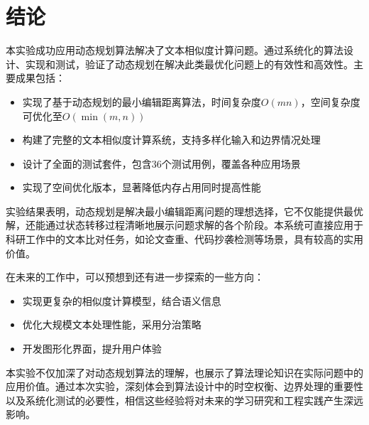 \documentclass[a4paper]{article}
\begin{document}
\section{结论}
本实验成功应用动态规划算法解决了文本相似度计算问题。通过系统化的算法设计、实现和测试，验证了动态规划在解决此类最优化问题上的有效性和高效性。主要成果包括：

\begin{itemize}
	\item 实现了基于动态规划的最小编辑距离算法，时间复杂度$O(mn)$，空间复杂度可优化至$O(\min(m,n))$
	\item 构建了完整的文本相似度计算系统，支持多样化输入和边界情况处理
	\item 设计了全面的测试套件，包含36个测试用例，覆盖各种应用场景
	\item 实现了空间优化版本，显著降低内存占用同时提高性能
\end{itemize}

实验结果表明，动态规划是解决最小编辑距离问题的理想选择，它不仅能提供最优解，还能通过状态转移过程清晰地展示问题求解的各个阶段。本系统可直接应用于科研工作中的文本比对任务，如论文查重、代码抄袭检测等场景，具有较高的实用价值。

在未来的工作中，可以预想到还有进一步探索的一些方向：
\begin{itemize}
	\item 实现更复杂的相似度计算模型，结合语义信息
	\item 优化大规模文本处理性能，采用分治策略
	\item 开发图形化界面，提升用户体验
\end{itemize}

本实验不仅加深了对动态规划算法的理解，也展示了算法理论知识在实际问题中的应用价值。通过本次实验，深刻体会到算法设计中的时空权衡、边界处理的重要性以及系统化测试的必要性，相信这些经验将对未来的学习研究和工程实践产生深远影响。
\end{document}
